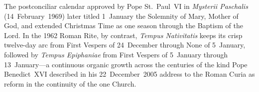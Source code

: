 The postconciliar calendar approved by Pope St.~Paul~VI in \textit{Mysterii
Paschalis} (14~February~1969) later titled 1~January the Solemnity of Mary,
Mother of God, and extended Christmas Time as one season through the Baptism of
the Lord. In the 1962 Roman Rite, by contrast, \textit{Tempus Nativitatis} keeps
its crisp twelve-day arc from First Vespers of 24~December through None of
5~January, followed by \textit{Tempus Epiphaniae} from First Vespers of
5~January through 13~January---a continuous organic growth across the centuries
of the kind Pope Benedict~XVI described in his 22~December~2005 address to the
Roman Curia as reform in the continuity of the one Church.
